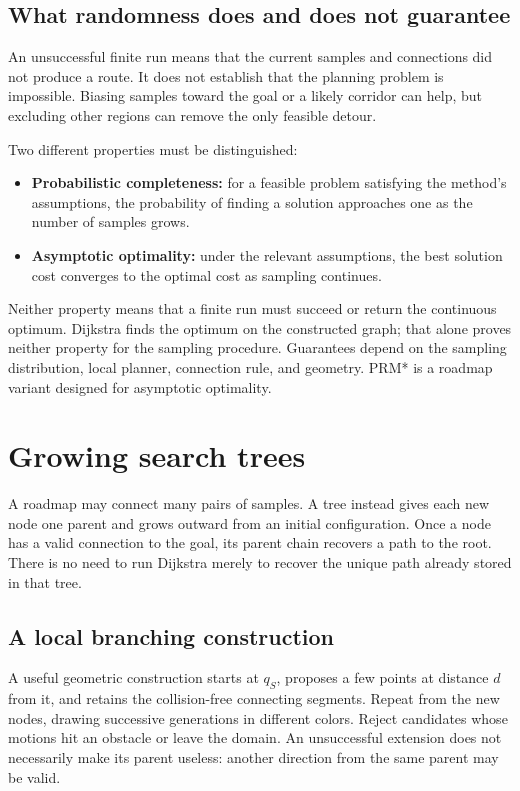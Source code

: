 \subsection{What randomness does and does not guarantee}
An unsuccessful finite run means that the current samples and connections
did not produce a route. It does not establish that the planning problem
is impossible. Biasing samples toward the goal or a likely corridor can
help, but excluding other regions can remove the only feasible detour.

Two different properties must be distinguished:
\begin{itemize}
\item \textbf{Probabilistic completeness:} for a feasible problem satisfying
the method's assumptions, the probability of finding a solution approaches
one as the number of samples grows.
\item \textbf{Asymptotic optimality:} under the relevant assumptions, the
best solution cost converges to the optimal cost as sampling continues.
\end{itemize}
Neither property means that a finite run must succeed or return the
continuous optimum. Dijkstra finds the optimum on the constructed graph;
that alone proves neither property for the sampling procedure. Guarantees
depend on the sampling distribution, local planner, connection rule, and
geometry. PRM* is a roadmap variant designed for asymptotic optimality.

\section{Growing search trees}
\label{sec:l13-trees}
A roadmap may connect many pairs of samples. A tree instead gives each
new node one parent and grows outward from an initial configuration.
Once a node has a valid connection to the goal, its parent chain recovers
a path to the root. There is no need to run Dijkstra merely to recover
the unique path already stored in that tree.

\subsection{A local branching construction}
A useful geometric construction starts at $q_S$, proposes a few points
at distance $d$ from it, and retains the collision-free connecting segments.
Repeat from the new nodes, drawing successive generations in different
colors. Reject candidates whose motions hit an obstacle or leave the domain.
An unsuccessful extension does not necessarily make its parent useless:
another direction from the same parent may be valid.

